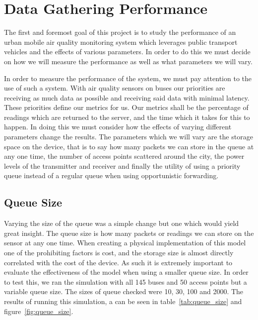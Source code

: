 \chapter{Data Gathering Performance}\label{data_gathering_performance} 


    The first and foremost goal of this project is to study the performance of an urban mobile air quality monitoring system which leverages public transport vehicles and the effects of various parameters. In order to do this we must decide on how we will measure the performance as well as what parameters we will vary. 

    In order to measure the performance of the system, we must pay attention to the use of such a system. With air quality sensors on buses our priorities are receiving as much data as possible and receiving said data with minimal latency. These priorities define our metrics for us. Our metrics shall be the percentage of readings which are returned to the server, and the time which it takes for this to happen. In doing this we must consider how the effects of varying different parameters change the results. The parameters which we will vary are the storage space on the device, that is to say how many packets we can store in the queue at any one time, the number of access points scattered around the city, the power levels of the transmitter and receiver and finally the utility of using a priority queue instead of a regular queue when using opportunistic forwarding.
	

    \section{Queue Size}\label{data_gathering_performance_queue_size}


        Varying the size of the queue was a simple change but one which would yield great insight. The queue size is how many packets or readings we can store on the sensor at any one time. When creating a physical implementation of this model one of the prohibiting factors is cost, and the storage size is almost directly correlated with the cost of the device. As such it is extremely important to evaluate the effectiveness of the model when using a smaller queue size. In order to test this, we ran the simulation with all 145 buses and 50 access points but a variable queue size. The sizes of queue checked were 10, 30, 100 and 2000. The results of running this simulation, a can be seen in table~\ref{tab:queue_size} and figure~\ref{fig:queue_size}. 

